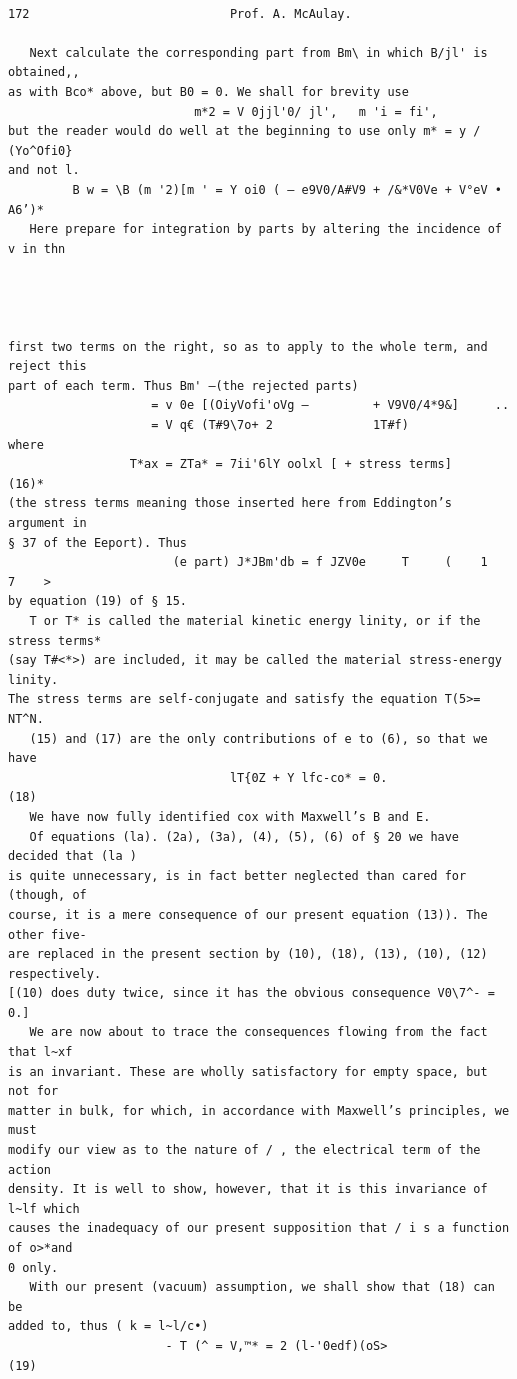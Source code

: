 \documentclass[10pt]{article}
\begin{document}
\clearpage
\begin{verbatim}

172                            Prof. A. McAulay.

   Next calculate the corresponding part from Bm\ in which B/jl' is obtained,,
as with Bco* above, but B0 = 0. We shall for brevity use
                          m*2 = V 0jjl'0/ jl',   m 'i = fi',
but the reader would do well at the beginning to use only m* = y / (Yo^Ofi0}
and not l.
         B w = \B (m '2)[m ' = Y oi0 ( — e9V0/A#V9 + /&*V0Ve + V°eV • A6’)*
   Here prepare for integration by parts by altering the incidence of v in thn




first two terms on the right, so as to apply to the whole term, and reject this
part of each term. Thus Bm' —(the rejected parts)
                    = v 0e [(OiyVofi'oVg —         + V9V0/4*9&]     ..
                    = V q€ (T#9\7o+ 2              1T#f)
where
                 T*ax = ZTa* = 7ii'6lY oolxl [ + stress terms]                (16)*
(the stress terms meaning those inserted here from Eddington’s argument in
§ 37 of the Eeport). Thus
                       (e part) J*JBm'db = f JZV0e     T     (    1   7    >
by equation (19) of § 15.
   T or T* is called the material kinetic energy linity, or if the stress terms*
(say T#<*>) are included, it may be called the material stress-energy linity.
The stress terms are self-conjugate and satisfy the equation T(5>= NT^N.
   (15) and (17) are the only contributions of e to (6), so that we have
                               lT{0Z + Y lfc-co* = 0.                         (18)
   We have now fully identified cox with Maxwell’s B and E.
   Of equations (la). (2a), (3a), (4), (5), (6) of § 20 we have decided that (la )
is quite unnecessary, is in fact better neglected than cared for (though, of
course, it is a mere consequence of our present equation (13)). The other five-
are replaced in the present section by (10), (18), (13), (10), (12) respectively.
[(10) does duty twice, since it has the obvious consequence V0\7^- = 0.]
   We are now about to trace the consequences flowing from the fact that l~xf
is an invariant. These are wholly satisfactory for empty space, but not for
matter in bulk, for which, in accordance with Maxwell’s principles, we must
modify our view as to the nature of / , the electrical term of the action
density. It is well to show, however, that it is this invariance of l~lf which
causes the inadequacy of our present supposition that / i s a function of o>*and
0 only.
   With our present (vacuum) assumption, we shall show that (18) can be
added to, thus ( k = l~l/c•)
                      - T (^ = V,™* = 2 (l-'0edf)(oS>                         (19)


\end{verbatim}
\end{document}
